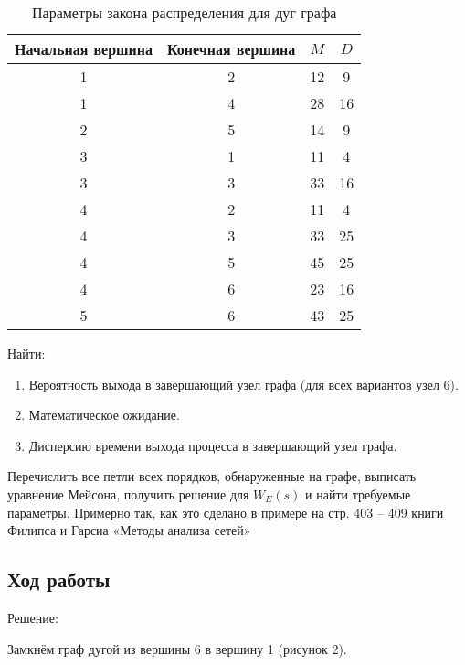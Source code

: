 \begin{table}[htb]
\centering
	\begin{tabular}{|c|c|c|c|}
	\hline 
	Начальная вершина & Конечная вершина & $M$ & $D$ \\ 
	\hline 
	1 & 2 & 12 & 9 \\ 
	\hline 
	1 & 4 & 28 & 16 \\ 
	\hline 
	2 & 5 & 14 & 9 \\ 
	\hline 
	3 & 1 & 11 & 4 \\ 
	\hline 
	3 & 3 & 33 & 16 \\ 
	\hline 
	4 & 2 & 11 & 4 \\ 
	\hline 
	4 & 3 & 33 & 25 \\ 
	\hline 
	4 & 5 & 45 & 25 \\ 
	\hline 
	4 & 6 & 23 & 16 \\ 
	\hline 
	5 & 6 & 43 & 25 \\ 
	\hline 
	\end{tabular} 
\caption{Параметры закона распределения для дуг графа}
\end{table}

Найти:
\begin{enumerate}
	\item Вероятность выхода в завершающий узел графа (для всех вариантов узел 6).
	\item Математическое ожидание.
	\item Дисперсию времени выхода процесса в завершающий узел графа.
\end{enumerate}

Перечислить все петли всех порядков, обнаруженные на графе, выписать уравнение Мейсона, получить решение для $W_E(s)$ и найти требуемые параметры. Примерно так, как это сделано в примере на стр. 403 -- 409 книги Филипса и Гарсиа «Методы анализа сетей»

\subsection{Ход работы}
Решение:

Замкнём граф дугой из вершины 6 в вершину 1 (рисунок 2).

